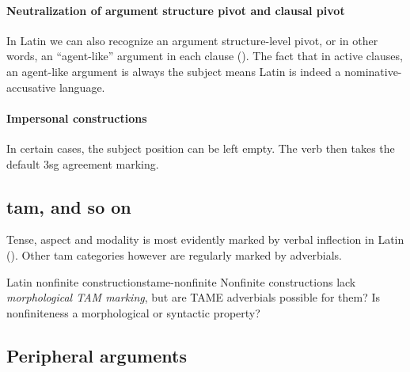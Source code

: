 \documentclass[a4paper, oneside, 12pt]{report}
\begin{document}
\paragraph*{Neutralization of argument structure pivot and clausal pivot}
In Latin we can also recognize an argument structure-level pivot,
or in other words, an ``agent-like'' argument in each clause
().
The fact that in active clauses, an agent-like argument is always the subject 
means Latin is indeed a nominative-accusative language.

\paragraph*{Impersonal constructions}
In certain cases, the subject position can be left empty.
The verb then takes the default 3sg agreement marking.

\subsection{\Ac{tam}, and so on}\label{sec:grammatical.clause.tam}

Tense, aspect and modality is most evidently marked by verbal inflection in Latin 
().
Other \ac{tam} categories however are regularly marked by adverbials.

\begin{todobox}{Latin nonfinite constructions}{tame-nonfinite}
    Nonfinite constructions lack \emph{morphological TAM marking},
    but are TAME adverbials possible for them?
    Is nonfiniteness a morphological or syntactic property?
\end{todobox}



\subsection{Peripheral arguments}\label{sec:grammatical.clause.peripheral}
\end{document}
